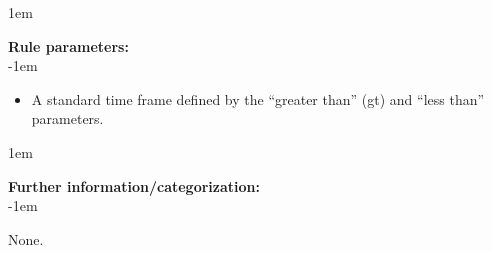 \openup 1em

{\bf Rule parameters:} \\

\openup -1em
\vspace{-2em}

\begin{itemize}
	\item A standard time frame defined by the ``greater than'' (gt) and ``less than'' parameters.
\end{itemize}

\openup 1em

{\bf Further information/categorization:} \\

\openup -1em
\vspace{-2em}


None.

\pagebreak

